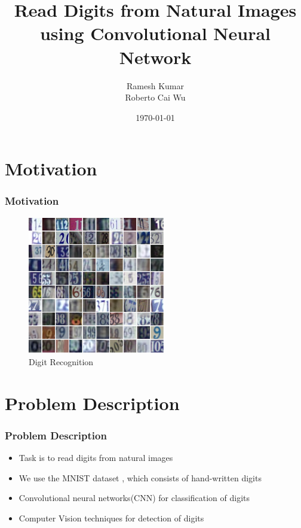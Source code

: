 \documentclass[11.5pt,aspectratio=1610,xcolor={usenames,dvipsnames,table}]{beamer}
\title{Read Digits from Natural Images using Convolutional Neural Network}
\author{Ramesh Kumar \\ Roberto Cai Wu}
\date{\today}
\begin{document}
\begin{frame}
\titlepage
\end{frame}


\section{Motivation}
\begin{frame}
	\frametitle{ Motivation}
	
	\begin{figure}[!h]
		\includegraphics[height = 6cm]{images/dataset.png}
		\caption{Digit Recognition \cite{SVHN}}
	\end{figure}
	
\end{frame}

\section{Problem Description}
\begin{frame}
\frametitle{Problem Description}
\begin{itemize}
	\item Task is to read digits from natural images
	\item We use the MNIST dataset \cite{mnist}, which consists of hand-written digits
	\item Convolutional neural networks(CNN) for classification of digits
	\item Computer Vision techniques for detection of digits
\end{itemize}

\end{frame}
\end{document}

